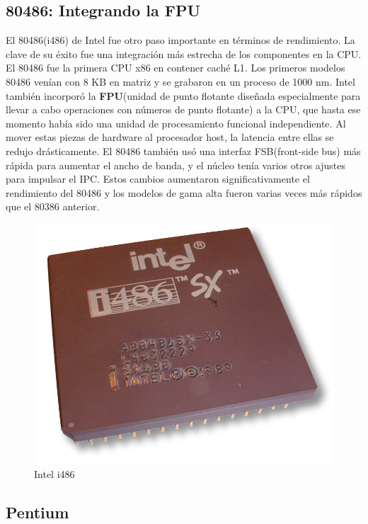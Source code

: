 \subsection{80486: Integrando la FPU}
El 80486(i486) de Intel fue otro paso importante en términos de rendimiento. La clave de su éxito fue una integración más estrecha de los componentes 
en la CPU. El 80486 fue la primera CPU x86 en contener caché L1. Los primeros modelos 80486 venían con 8 KB en matriz y se grabaron en un proceso de 1000 nm.
Intel también incorporó la \textbf{FPU}(unidad de punto flotante diseñada especialmente para llevar a cabo operaciones con números de punto flotante) a la CPU, que hasta ese 
momento había sido una unidad de procesamiento funcional independiente. Al mover estas piezas de hardware al procesador host, la latencia entre ellas se redujo 
drásticamente. El 80486 también usó una interfaz FSB(front-side bus) más rápida para aumentar el ancho de banda, y el núcleo 
tenía varios otros ajustes para impulsar el IPC. Estos cambios aumentaron significativamente el rendimiento del 80486 y los modelos de gama alta fueron varias 
veces más rápidos que el 80386 anterior. 

\begin{figure}[htb]
	\centering
	\includegraphics[scale = 0.15]{Graphics/Intel_80486sx.jpg}
	\caption{Intel i486}
	\label{fig:21}
\end{figure}

\subsection{Pentium}

